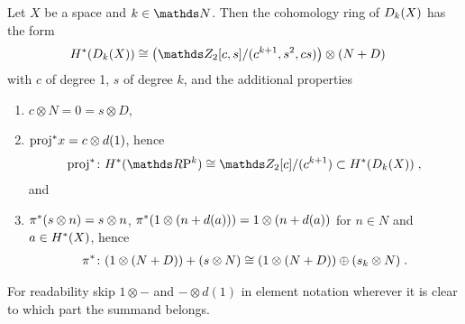 \begin{Thm}\label{thm:twistedprod:cohomstructure}
  Let $X$ be a space and $k\in\Nat$.
  Then the cohomology ring of $D_{k}({X})$ has the form
  \begin{align*}
    \H^*(\Twistedprod{k}{X})
    &\cong
      \left(
      \Zmod2[c,s]/(c^{k+1},s^2,cs)
      \right)
      \otimes (N+D)
  \end{align*}
  with $c$ of degree 1, $s$ of degree $k$, and the additional
  properties
  \begin{enumerate}
  \item $c\otimes N=0=s\otimes D$, 
  \item ${\mathrm{proj}}^* x = c\otimes d(1)$,
    hence
    \begin{gather*}
      \pb\proj\colon\H^*(\RP k)\cong
      \Zmod2[c]/(c^{k+1})\subset\H^*(\Twistedprod k X)
      \;,
    \end{gather*}
    and
  \item\label{item:twistedprodcohom:pi}
    ${\pi}^* (s\otimes n) = s\otimes n$,
    ${\pi}^* (1\otimes (n+d(a))) = 1\otimes (n+d(a))$
    for $n\in N$ and $a\in H^*(X)$,
    hence
    \begin{gather*}
      {\pi}^*\colon (1\otimes(N+D)) + (s\otimes N)
      \cong (1\otimes(N+D))\oplus (s_k\otimes N)
      \;.
    \end{gather*}
  \end{enumerate}
  For readability skip $1\otimes-$ and $-\otimes d(1)$ in element
  notation wherever it is clear to which part the summand
  belongs.
\end{Thm}

